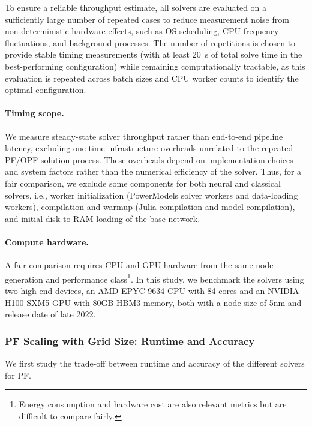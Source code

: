 To ensure a reliable throughput estimate, all solvers are evaluated on a sufficiently large number of repeated cases to reduce measurement noise from non-deterministic hardware effects, such as OS scheduling, CPU frequency fluctuations, and background processes. The number of repetitions is chosen to provide stable timing measurements (with at least 20~s of total solve time in the best-performing configuration) while remaining computationally tractable, as this evaluation is repeated across batch sizes and CPU worker counts to identify the optimal configuration.


\paragraph{Timing scope.}
We measure steady-state solver throughput rather than end-to-end pipeline latency, excluding one-time infrastructure overheads unrelated to the repeated PF/OPF solution process. These overheads depend on implementation choices and system factors rather than the numerical efficiency of the solver.
Thus, for a fair comparison, we exclude some components for both neural and classical solvers, i.e., worker initialization (PowerModels solver workers and \genco data-loading workers), compilation and warmup (Julia compilation and model compilation), and initial disk-to-RAM loading of the base network. 




\paragraph{Compute hardware.}
A fair comparison requires CPU and GPU hardware from the same node generation and performance class\footnote{Energy consumption and hardware cost are also relevant metrics but are difficult to compare fairly.}. In this study, we benchmark the solvers using two high-end devices, an AMD EPYC 9634 CPU with 84 cores and an NVIDIA H100 SXM5 GPU with 80GB HBM3 memory, both with a node size of 5nm and release date of late 2022. \\




\subsubsection{PF Scaling with Grid Size: Runtime and Accuracy}
 
We first study the trade-off between runtime and accuracy of the different solvers for PF.\\


